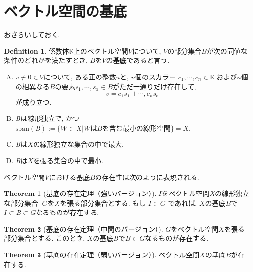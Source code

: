 \documentclass[a4paper]{ujarticle}
\numberwithin{equation}{section}
\theoremstyle{definition}
\newtheorem{definition}{Definition}
\newtheorem{theorem}{Theorem}
\begin{document}
\section{ベクトル空間の基底 \cite[Chap.11]{Schechter99}}

    おさらいしておく.
    \begin{definition}
        係数体$\mathbb{K}$上のベクトル空間$V$について, $V$の部分集合$B$が次の同値な条件のどれかを満たすとき, 
        $B$を$V$の\textbf{基底}であると言う.
        \begin{enumerate}[(A)]
            \item $v \neq 0 \in V$について, ある正の整数$n$と, 
            $n$個のスカラー $c_1, \cdots, c_n \in \mathbb{K}$
            および$n$個の相異なる$B$の要素$s_1, \cdots, s_n \in B$がただ一通りだけ存在して,
            \[
                v = c_1 s_1 + \cdots, c_n s_n
            \]
            が成り立つ.
            \item $B$は線形独立で, かつ$\mathrm{span}(B) := \{W \subset X | \text{$W$は$B$を含む最小の線形空間} \} = X$.
            \item $B$は$X$の線形独立な集合の中で最大.
            \item $B$は$X$を張る集合の中で最小.
        \end{enumerate}
    \end{definition}

    ベクトル空間$V$における基底$B$の存在性は次のように表現される.

    \begin{theorem}[基底の存在定理（強いバージョン）] \label{Th:str}
        $I$をベクトル空間$X$の線形独立な部分集合, $G$を$X$を張る部分集合とする.
        もし $I \subset G$ であれば, $X$の基底$B$で$I \subset B \subset G$なるものが存在する.
    \end{theorem}

    \begin{theorem}[基底の存在定理（中間のバージョン）] \label{Th:imd}
        $G$をベクトル空間$X$を張る部分集合とする.
        このとき, $X$の基底$B$で$B \subset G$なるものが存在する.
    \end{theorem}

    \begin{theorem}[基底の存在定理（弱いバージョン）] \label{Th:weak}
        ベクトル空間$X$の基底$B$が存在する.
    \end{theorem}
\end{document}
